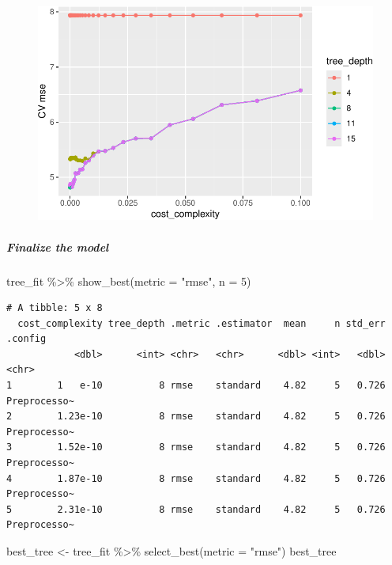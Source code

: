 \documentclass[
]{article}
\let\oldsubparagraph\subparagraph
\renewcommand{\subparagraph}[1]{\oldsubparagraph{#1}\mbox{}}
\newenvironment{Shaded}{\begin{snugshade}}{\end{snugshade}}
\newcommand{\AttributeTok}[1]{\textcolor[rgb]{0.40,0.45,0.13}{#1}}
\newcommand{\DecValTok}[1]{\textcolor[rgb]{0.68,0.00,0.00}{#1}}
\newcommand{\FunctionTok}[1]{\textcolor[rgb]{0.28,0.35,0.67}{#1}}
\newcommand{\NormalTok}[1]{\textcolor[rgb]{0.00,0.23,0.31}{#1}}
\newcommand{\OtherTok}[1]{\textcolor[rgb]{0.00,0.23,0.31}{#1}}
\newcommand{\SpecialCharTok}[1]{\textcolor[rgb]{0.37,0.37,0.37}{#1}}
\newcommand{\StringTok}[1]{\textcolor[rgb]{0.13,0.47,0.30}{#1}}
\begin{document}
\begin{figure}[H]

{\centering \includegraphics{hw4_files/figure-pdf/unnamed-chunk-9-1.pdf}

}

\end{figure}

\hypertarget{finalize-the-model}{%
\subparagraph{Finalize the model}\label{finalize-the-model}}

\begin{Shaded}
\begin{Highlighting}[]
\NormalTok{tree\_fit }\SpecialCharTok{\%\textgreater{}\%}
  \FunctionTok{show\_best}\NormalTok{(}\AttributeTok{metric =} \StringTok{"rmse"}\NormalTok{, }\AttributeTok{n =} \DecValTok{5}\NormalTok{)}
\end{Highlighting}
\end{Shaded}

\begin{verbatim}
# A tibble: 5 x 8
  cost_complexity tree_depth .metric .estimator  mean     n std_err .config     
            <dbl>      <int> <chr>   <chr>      <dbl> <int>   <dbl> <chr>       
1        1   e-10          8 rmse    standard    4.82     5   0.726 Preprocesso~
2        1.23e-10          8 rmse    standard    4.82     5   0.726 Preprocesso~
3        1.52e-10          8 rmse    standard    4.82     5   0.726 Preprocesso~
4        1.87e-10          8 rmse    standard    4.82     5   0.726 Preprocesso~
5        2.31e-10          8 rmse    standard    4.82     5   0.726 Preprocesso~
\end{verbatim}

\begin{Shaded}
\begin{Highlighting}[]
\NormalTok{best\_tree }\OtherTok{\textless{}{-}}\NormalTok{ tree\_fit }\SpecialCharTok{\%\textgreater{}\%}
  \FunctionTok{select\_best}\NormalTok{(}\AttributeTok{metric =} \StringTok{"rmse"}\NormalTok{)}
\NormalTok{best\_tree}
\end{Highlighting}
\end{Shaded}
\end{document}
